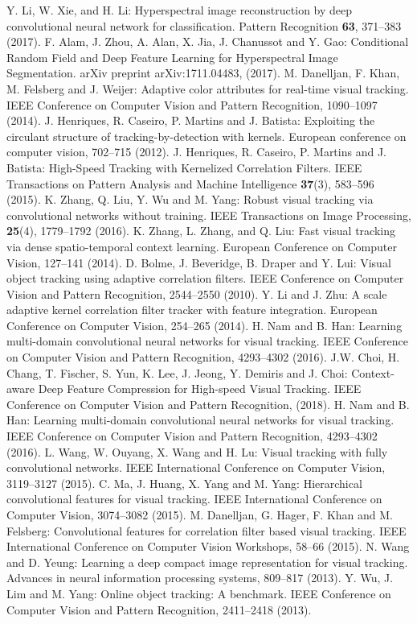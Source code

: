 \documentclass[runningheads,a4paper]{llncs}
\begin{document}
\begin{thebibliography}{8}
Y. Li, W. Xie, and H. Li: Hyperspectral image reconstruction by deep convolutional neural network for classification. Pattern Recognition \textbf{63}, 371--383 (2017).
F. Alam, J. Zhou, A. Alan, X. Jia, J. Chanussot and Y. Gao: Conditional Random Field and Deep Feature Learning for Hyperspectral Image Segmentation. arXiv preprint arXiv:1711.04483, (2017).
M. Danelljan, F. Khan, M. Felsberg and J. Weijer: Adaptive color attributes for real-time visual tracking. IEEE Conference on Computer Vision and Pattern Recognition, 1090--1097 (2014).
J. Henriques, R. Caseiro, P. Martins and J. Batista: Exploiting the circulant structure of tracking-by-detection with kernels. European conference on computer vision, 702--715 (2012).
J. Henriques, R. Caseiro, P. Martins and J. Batista: High-Speed Tracking with Kernelized Correlation Filters. IEEE Transactions on Pattern Analysis and Machine Intelligence \textbf{37}(3), 583--596 (2015).
K. Zhang, Q. Liu, Y. Wu and M. Yang: Robust visual tracking via convolutional networks without training. IEEE Transactions on Image Processing, \textbf{25}(4), 1779--1792 (2016).
K. Zhang, L. Zhang, and Q. Liu: Fast visual tracking via dense spatio-temporal context learning. European Conference on Computer Vision, 127--141 (2014).
D. Bolme, J. Beveridge, B. Draper and Y. Lui: Visual object tracking using adaptive correlation filters. IEEE Conference on Computer Vision and Pattern Recognition, 2544--2550 (2010).
Y. Li and J. Zhu: A scale adaptive kernel correlation filter tracker with feature integration. European Conference on Computer Vision, 254--265 (2014).
H. Nam and B. Han: Learning multi-domain convolutional neural networks for visual tracking. IEEE Conference on Computer Vision and Pattern Recognition, 4293--4302 (2016).
J.W. Choi, H. Chang, T. Fischer, S. Yun, K. Lee, J. Jeong, Y. Demiris and J. Choi: Context-aware Deep Feature Compression for High-speed Visual Tracking. IEEE Conference on Computer Vision and Pattern Recognition, (2018).
H. Nam and B. Han: Learning multi-domain convolutional neural networks for visual tracking. IEEE Conference on Computer Vision and Pattern Recognition, 4293--4302 (2016).
L. Wang, W. Ouyang, X. Wang and H. Lu: Visual tracking with fully convolutional networks. IEEE International Conference on Computer Vision, 3119--3127 (2015).
C. Ma, J. Huang, X. Yang and M. Yang: Hierarchical convolutional features for visual tracking. IEEE International Conference on Computer Vision, 3074--3082 (2015).
M. Danelljan, G. Hager, F. Khan and M. Felsberg: Convolutional features for correlation filter based visual tracking. IEEE International Conference on Computer Vision Workshops, 58--66 (2015).
N. Wang and D. Yeung: Learning a deep compact image representation for visual tracking. Advances in neural information processing systems, 809--817 (2013).
Y. Wu, J. Lim and M. Yang: Online object tracking: A benchmark. IEEE Conference on Computer Vision and Pattern Recognition, 2411--2418 (2013).


\end{thebibliography}
\end{document}
